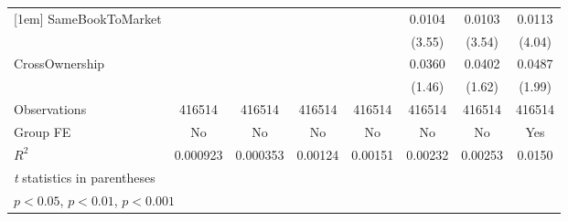 {\begin{tabular}{l*{7}{c}}
[1em]
SameBookToMarket&                  &                  &                  &                  &   0.0104\sym{***}&   0.0103\sym{***}&   0.0113\sym{***}\\
                &                  &                  &                  &                  &   (3.55)         &   (3.54)         &   (4.04)         \\
[1em]
CrossOwnership  &                  &                  &                  &                  &   0.0360         &   0.0402         &   0.0487         \\
                &                  &                  &                  &                  &   (1.46)         &   (1.62)         &   (1.99)         \\
\hline
Observations    &   416514         &   416514         &   416514         &   416514         &   416514         &   416514         &   416514         \\
Group FE        &       No         &       No         &       No         &       No         &       No         &       No         &      Yes         \\
$ R^2 $         & 0.000923         & 0.000353         &  0.00124         &  0.00151         &  0.00232         &  0.00253         &   0.0150         \\
\hline\hline
\multicolumn{8}{l}{\footnotesize \textit{t} statistics in parentheses}\\
\multicolumn{8}{l}{\footnotesize \sym{*} \(p<0.05\), \sym{**} \(p<0.01\), \sym{***} \(p<0.001\)}\\
\end{tabular}
}
